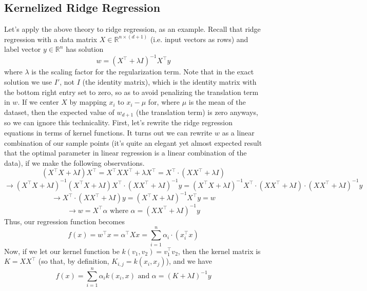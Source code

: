 \subsection{Kernelized Ridge Regression}
Let's apply the above theory to ridge regression, as an example. Recall that ridge regression with a data matrix $ X \in \mathbb{R}^{n \times (d + 1)} $ (i.e. input vectors as rows) and label vector $ y \in \mathbb{R}^n $ has solution
$$ w = (X^\intercal + \lambda I)^{-1} X^{\intercal} y $$
where $ \lambda $ is the scaling factor for the regularization term. Note that in the exact solution we use $ I' $, not $ I $ (the identity matrix), which is the identity matrix with the bottom right entry set to zero, so as to avoid penalizing the translation term in $ w $. If we center $ X $ by mapping $ x_i $ to $ x_i - \mu $ for, where $ \mu $ is the mean of the dataset, then the expected value of $ w_{d + 1} $ (the translation term) is zero anyways, so we can ignore this technicality.
\newline
First, let's rewrite the ridge regression equations in terms of kernel functions. It turns out we can rewrite $ w $ as a linear combination of our sample points (it's quite an elegant yet almost expected result that the optimal parameter in linear regression is a linear combination of the data), if we make the following observations.
$$ (X^\intercal X + \lambda I) X^\intercal = X^\intercal X X^\intercal + \lambda X^\intercal = X^\intercal \cdot (X X^\intercal + \lambda I) $$
$$ \rightarrow (X^\intercal X + \lambda I)^{-1} (X^\intercal X + \lambda I) X^\intercal \cdot (X X^\intercal + \lambda I)^{-1} y = (X^\intercal X + \lambda I)^{-1} X^\intercal \cdot (X X^\intercal + \lambda I) \cdot (X X^\intercal + \lambda I)^{-1} y $$
$$ \rightarrow X^\intercal \cdot (X X^\intercal + \lambda I) y = (X^\intercal X + \lambda I)^{-1} X^\intercal y = w $$
$$ \rightarrow w = X^\intercal \alpha \text{ where } \alpha = (X X^\intercal + \lambda I)^{-1} y $$
Thus, our regression function becomes
$$ f(x) = w^\intercal x = \alpha^\intercal X x = \sum_{i = 1}^n \alpha_i \cdot (x^\intercal_i x) $$
Now, if we let our kernel function be $ k(v_1, v_2) = v_1^\intercal v_2 $, then the kernel matrix is $ K = X X^\intercal $ (so that, by definition, $ K_{i, j} = k(x_i, x_j) $), and we have
$$ f(x) = \sum_{i = 1}^n \alpha_i k(x_i, x) \text{ and } \alpha = (K + \lambda I)^{-1} y $$
\newline
